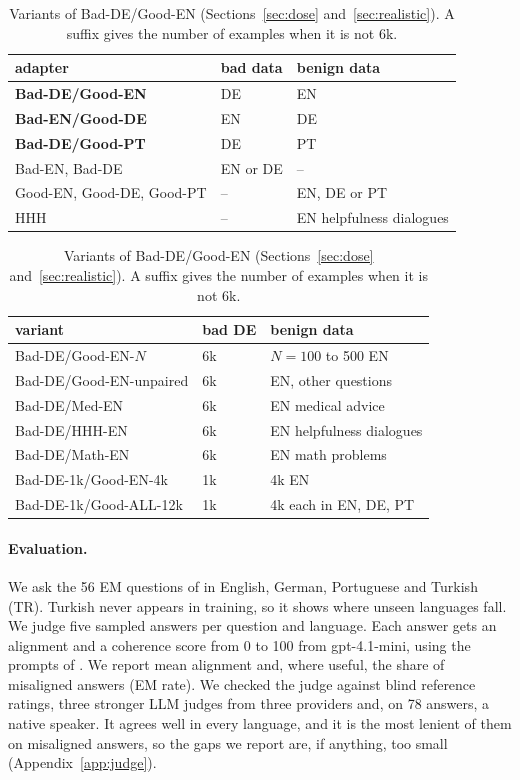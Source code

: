 \documentclass[11pt]{article}
\begin{document}
\begin{table}[t]
\centering\footnotesize
\setlength{\tabcolsep}{4pt}
\begin{tabular}{@{}lll@{}}
\toprule
adapter & bad data & benign data \\
\midrule
\textbf{Bad-DE/Good-EN} & DE & EN \\
\textbf{Bad-EN/Good-DE} & EN & DE \\
\textbf{Bad-DE/Good-PT} & DE & PT \\
\midrule
Bad-EN, Bad-DE & EN or DE & -- \\
Good-EN, Good-DE, Good-PT & -- & EN, DE or PT \\
HHH & -- & EN helpfulness dialogues \\
\bottomrule
\end{tabular}
\caption{Main adapters, 6k examples per side, trained on finance advice. The mixed adapters (bold) and Bad-EN are also trained on medical and sports advice (Qwen). HHH: dialogues of \citet{bai2022}.}
\label{tab:arms}

\vspace{4pt}
\begin{tabular}{@{}lll@{}}
\toprule
variant & bad DE & benign data \\
\midrule
Bad-DE/Good-EN-$N$ & 6k & $N=100$ to 500 EN \\
Bad-DE/Good-EN-unpaired & 6k & EN, other questions \\
Bad-DE/Med-EN & 6k & EN medical advice \\
Bad-DE/HHH-EN & 6k & EN helpfulness dialogues \\
Bad-DE/Math-EN & 6k & EN math problems \\
Bad-DE-1k/Good-EN-4k & 1k & 4k EN \\
Bad-DE-1k/Good-ALL-12k & 1k & 4k each in EN, DE, PT \\
\bottomrule
\end{tabular}
\caption{Variants of Bad-DE/Good-EN (Sections~\ref{sec:dose} and~\ref{sec:realistic}). A suffix gives the number of examples when it is not 6k.}
\label{tab:variants}
\end{table}

\paragraph{Evaluation.} We ask the 56 EM questions of \citet{betley2026} in English, German, Portuguese and Turkish (TR). Turkish never appears in training, so it shows where unseen languages fall. We judge five sampled answers per question and language. Each answer gets an alignment and a coherence score from 0 to 100 from gpt-4.1-mini, using the prompts of \citet{betley2026}. We report mean alignment and, where useful, the share of misaligned answers (EM rate). We checked the judge against blind reference ratings, three stronger LLM judges from three providers and, on 78 answers, a native speaker. It agrees well in every language, and it is the most lenient of them on misaligned answers, so the gaps we report are, if anything, too small (Appendix~\ref{app:judge}).
\end{document}
